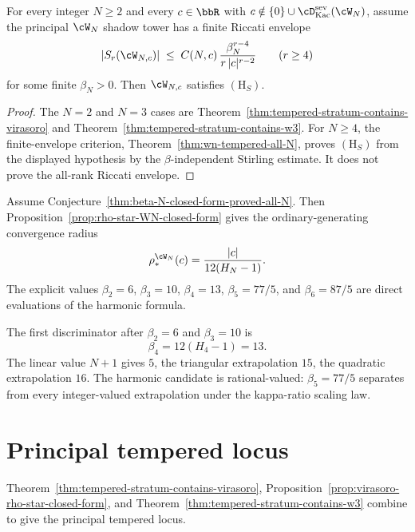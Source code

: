 \begin{theorem}
\label{conj:wn-tempered-general}
For every integer $N \ge 2$ and every $c \in \bbR$ with
$c \notin \{0\} \cup \cD^{\mathrm{sev}}_{\mathrm{Kac}}(\cW_N)$, assume
the principal $\cW_N$ shadow tower has a finite Riccati envelope
\[
 \lvert S_r(\cW_{N,c}) \rvert
 \;\le\;
 C(N,c)\,\frac{\beta_N^{r-4}}{r\,|c|^{r-2}}
 \qquad (r\ge 4)
\]
for some finite $\beta_N>0$. Then $\cW_{N, c}$ satisfies
$(\mathrm{H}_S)$.
\end{theorem}

\begin{proof}
The $N=2$ and $N=3$ cases are
Theorem~\ref{thm:tempered-stratum-contains-virasoro} and
Theorem~\ref{thm:tempered-stratum-contains-w3}. For $N\ge4$, the
finite-envelope criterion, Theorem~\ref{thm:wn-tempered-all-N}, proves
$(\mathrm{H}_S)$ from the displayed hypothesis by the
$\beta$-independent Stirling estimate. It does not prove the all-rank
Riccati envelope.
\end{proof}

\begin{remark}
\label{rem:wn-conditional-harmonic-radius}
Assume Conjecture~\ref{thm:beta-N-closed-form-proved-all-N}. Then
Proposition~\ref{prop:rho-star-WN-closed-form} gives the
ordinary-generating convergence radius
\[
 \rho_*^{\cW_N}(c)
 =
 \frac{\lvert c\rvert}{12(H_N-1)}.
\]
The explicit values
\(\beta_2=6\), \(\beta_3=10\), \(\beta_4=13\),
\(\beta_5=77/5\), and \(\beta_6=87/5\) are direct evaluations of the
harmonic formula.
\end{remark}

\begin{remark}
\label{rem:w4-numerical-probe}
The first discriminator after $\beta_2=6$ and $\beta_3=10$ is
\[
 \beta_4=12(H_4-1)=13.
\]
The linear value $N+1$ gives $5$, the triangular extrapolation $15$,
the quadratic extrapolation $16$. The harmonic candidate is
rational-valued: $\beta_5=77/5$ separates from every integer-valued
extrapolation under the kappa-ratio scaling law.
\end{remark}

\section{Principal tempered locus}
\label{sec:healed-dichotomy}

Theorem~\ref{thm:tempered-stratum-contains-virasoro},
Proposition~\ref{prop:virasoro-rho-star-closed-form}, and
Theorem~\ref{thm:tempered-stratum-contains-w3} combine to give the
principal tempered locus.

